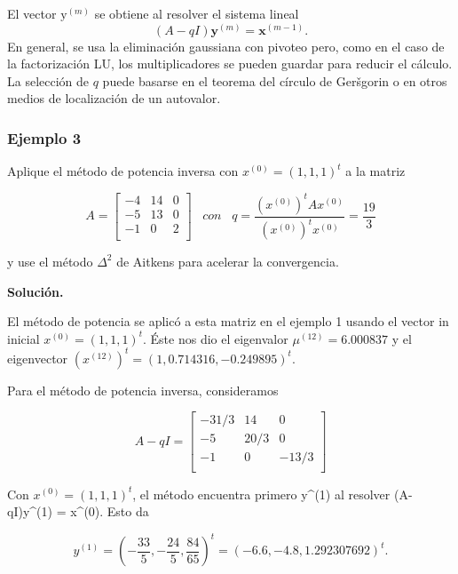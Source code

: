 \documentclass{report}
\numberwithin{subsection}{section} %
\begin{document}
El vector $\text{y}^{\left( m \right)}$ se obtiene al resolver el sistema lineal
\begin{equation*}
\left( A - qI \right) \textbf{y}^{\left( m \right)} = \textbf{x}^{\left( m - 1 \right)}.
\end{equation*}
En general, se usa la eliminación gaussiana con pivoteo pero, como en el caso de la factorización LU, los multiplicadores se pueden guardar para reducir el cálculo. La selección de $q$ puede basarse en el teorema del círculo de Geršgorin o en otros medios de localización de un autovalor.

\subsubsection*{Ejemplo 3} %

    Aplique el método de potencia inversa con $x^{(0)} = (1, 1, 1)^t$ a la matriz

    $$A =\begin{bmatrix}
        -4 & 14 & 0 \\
        -5 & 13 & 0 \\
        -1 & 0 & 2 \\
    \end{bmatrix} \;\;\; con \;\;\; q = \frac{(x^{(0)})^t Ax^{(0)}}{(x^{(0)})^tx^{(0)}} = \frac{19}{3}$$

    y use el método $\Delta^2$ de Aitkens para acelerar la convergencia.

    {\bf Solución.}

    El método de potencia se aplicó a esta matriz en el ejemplo 1 usando el vector in inicial $x^{(0)} = (1,1,1)^t.$ Éste nos dio el eigenvalor $\mu^{(12)} = 6.000837$ y el eigenvector $(x^{(12)})^t = (1, 0.714316, -0.249895)^t$.

    Para el método de potencia inversa, consideramos

    $$A - qI =\begin{bmatrix}
        -31/3 & 14 & 0 \\
        -5 & 20/3 & 0 \\
        -1 & 0 & -13/3 \\
    \end{bmatrix}$$

    Con $x^(0) = (1, 1, 1)^t$, el método encuentra primero y^{(1)} al resolver (A- qI)y^{(1)} = x^(0). Esto da

    $$y^{(1)} = (-\frac{33}{5},-\frac{24}{5},\frac{84}{65})^t = (-6.6,-4.8, 1.292307692)^t.$$
\end{document}
